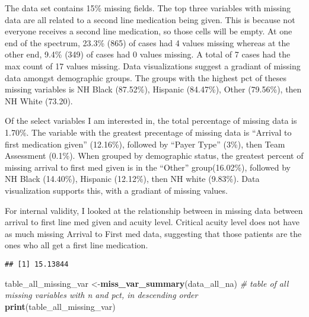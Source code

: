 \documentclass[]{article}
\newenvironment{Shaded}{\begin{snugshade}}{\end{snugshade}}
\newcommand{\KeywordTok}[1]{\textcolor[rgb]{0.13,0.29,0.53}{\textbf{#1}}}
\newcommand{\CommentTok}[1]{\textcolor[rgb]{0.56,0.35,0.01}{\textit{#1}}}
\newcommand{\NormalTok}[1]{#1}
\begin{document}
The data set contains 15\% missing fields. The top three variables with
missing data are all related to a second line medication being given.
This is because not everyone receives a second line medication, so those
cells will be empty. At one end of the spectrum, 23.3\% (865) of cases
had 4 values missing whereas at the other end, 9.4\% (349) of cases had
0 values missing. A total of 7 cases had the max count of 17 values
missing. Data visualizations suggest a gradiant of missing data amongst
demographic groups. The groups with the highest pct of theses missing
variables is NH Black (87.52\%), Hispanic (84.47\%), Other (79.56\%),
then NH White (73.20).

Of the select variables I am interested in, the total percentage of
missing data is 1.70\%. The variable with the greatest precentage of
missing data is ``Arrival to first medication given'' (12.16\%),
followed by ``Payer Type'' (3\%), then Team Assessment (0.1\%). When
grouped by demographic status, the greatest percent of missing arrival
to first med given is in the ``Other'' group(16.02\%), followed by NH
Black (14.40\%), Hispanic (12.12\%), then NH white (9.83\%). Data
visualization supports this, with a gradiant of missing values.

For internal validity, I looked at the relationship between in missing
data between arrival to first line med given and acuity level. Critical
acuity level does not have as much missing Arrival to First med data,
suggesting that those patients are the ones who all get a first line
medication.

\begin{Shaded}
\end{Shaded}

\begin{verbatim}
## [1] 15.13844
\end{verbatim}

\begin{Shaded}
\begin{Highlighting}[]
\NormalTok{table_all_missing_var <-}\KeywordTok{miss_var_summary}\NormalTok{(data_all_na) }\CommentTok{# table of all missing variables with n and pct, in descending order}
\KeywordTok{print}\NormalTok{(table_all_missing_var)}
\end{Highlighting}
\end{Shaded}
\end{document}

